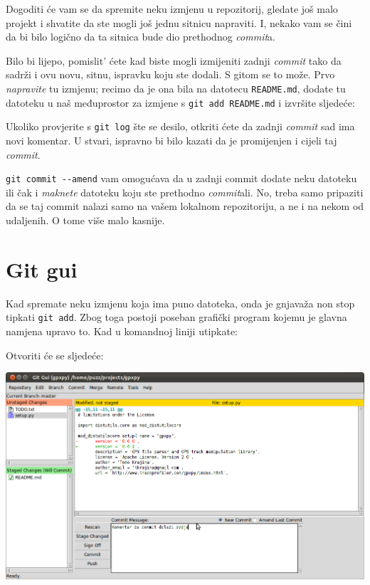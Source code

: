 Dogoditi će vam se da spremite neku izmjenu u repozitorij, gledate još malo projekt i shvatite da ste mogli još jednu sitnicu napraviti.
I, nekako vam se čini da bi bilo logično da ta sitnica bude dio prethodnog \emph{commit}a.

Bilo bi lijepo, pomislit' ćete kad biste mogli izmijeniti zadnji \emph{commit} tako da sadrži i ovu novu, sitnu, ispravku koju ste dodali.
S gitom se to može.
Prvo \emph{napravite} tu izmjenu; recimo da je ona bila na datotecu \verb+README.md+, dodate tu datoteku u naš međuprostor za izmjene s \verb+git add README.md+ i izvršite sljedeće:


Ukoliko provjerite s \verb+git log+ šte se desilo, otkriti ćete da zadnji \emph{commit} sad ima novi komentar.
U stvari, ispravno bi bilo kazati da je promijenjen i cijeli taj \emph{commit}.

\verb+git commit --amend+ vam omogućava da u zadnji commit dodate neku datoteku ili čak i \emph{maknete} datoteku koju ste prethodno \emph{commit}ali. 
No, treba samo pripaziti da se taj commit nalazi samo na vašem lokalnom repozitoriju, a ne i na nekom od udaljenih. 
O tome više malo kasnije.

\section*{Git gui}

Kad spremate neku izmjenu koja ima puno datoteka, onda je gnjavaža non stop tipkati \verb+git add+.
Zbog toga postoji poseban grafički program kojemu je glavna namjena upravo to.
Kad u komandnoj liniji utipkate:


Otvoriti će se sljedeće:

\includegraphics[width=14cm]{images/git-gui.png}

